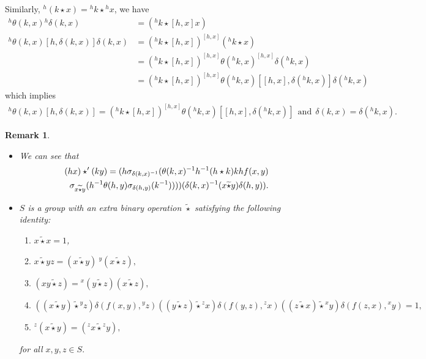 \documentclass[10 pt,oneside,reqno,a4paper]{amsart}
\newtheorem{remark}[theorem]{Remark}
\numberwithin{equation}{section}
\begin{document}
\begin{enumerate}
Similarly, $^h(k \star x)= {^hk} \star {^hx}$, we have
\begin{align*}
    {^h\theta(k,x)} {^h\delta(k,x)}&= ({^hk} \star [h,x] x)\\
    {^h\theta(k,x)} [h,\delta(k,x)] \delta(k,x)&= ({^hk} \star [h,x]) ^{[h,x]}({^hk \star x}) \\
    &= ({^hk} \star [h,x]) ^{[h,x]}\theta({^hk},x) ^{[h,x]}\delta({^hk},x) \\ 
    &= ({^hk} \star [h,x]) ^{[h,x]}\theta({^hk},x) [[h,x],\delta({^hk},x)] \delta({^hk},x)
\end{align*}
which implies 
\begin{align}
    {^h\theta(k,x)} [h,\delta(k,x)]= ({^hk} \star [h,x]) ^{[h,x]}\theta({^hk},x) [[h,x],\delta({^hk},x)] ~~\text{and}~~ \delta(k,x)=\delta({^hk},x).
\end{align}
\begin{remark}
\begin{itemize}
    \item We can see that \begin{align*}
        (hx) \star' (ky)= (h \sigma_{\delta(k,x)^{-1}}(\theta(k,x)^{-1}h^{-1}(h \star k)kh f(x,y) \notag\\\sigma_{x\widetilde{\star}y}(h^{-1}\theta(h,y)\sigma_{\delta(h,y)}(k^{-1})))) (\delta(k,x)^{-1}(x \widetilde{\star} y)\delta(h,y)). 
    \end{align*}
\item $S$ is a group with an extra binary operation $\widetilde{\star}$ satisfying the following identity:
\begin{enumerate}
\item $ x\widetilde{\star} x= 1$,
    \item $ x\widetilde{\star} yz= (x\widetilde{\star} y)~{^y(x\widetilde{\star} z)},$
            \item $(xy\widetilde{\star} z)={^x(y\widetilde{\star} z)}(x\widetilde{\star} z),$
                         \item $((x\widetilde{\star} y) \widetilde {\star} {^yz})\delta(f(x,y), {^yz})  ((y\widetilde{\star} z) \widetilde {\star} {^zx})\delta(f(y,z), {^zx})((z\widetilde{\star} x) \widetilde {\star} {^xy})\delta(f(z,x), {^xy})=1,$

\item ${^z(x\widetilde{\star} y)}=({^zx} \widetilde{\star} {^zy}),$
\end{enumerate} for all $x, y, z \in S.$
\end{itemize}
\end{remark}


\end{enumerate}
\end{document}

